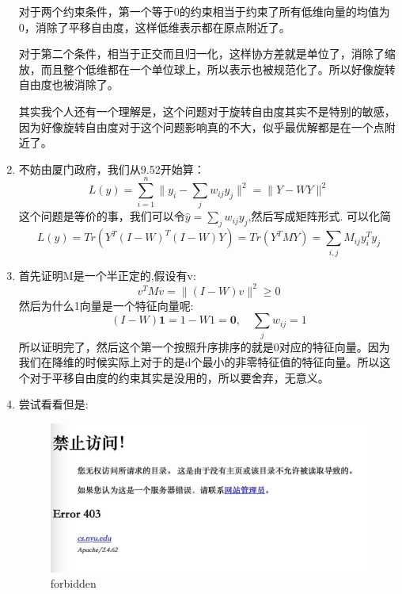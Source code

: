 \documentclass[answers]{exam}  %
\begin{document}
\begin{enumerate}[label=\alph*.]
    对于两个约束条件，第一个等于0的约束相当于约束了所有低维向量的均值为0，消除了平移自由度，这样低维表示都在原点附近了。

    对于第二个条件，相当于正交而且归一化，这样协方差就是单位了，消除了缩放，而且整个低维都在一个单位球上，所以表示也被规范化了。所以好像旋转自由度也被消除了。

    其实我个人还有一个理解是，这个问题对于旋转自由度其实不是特别的敏感，因为好像旋转自由度对于这个问题影响真的不大，似乎最优解都是在一个点附近了。

    \item 不妨由厦门政府，我们从9.52开始算：
    \[
        L(y) = \sum_{i=1}^{n}\|y_i - \sum_{j} w_{ij}y_j\|^2 = \|Y - WY\|^2
    \]
    这个问题是等价的事，我们可以令$\hat{y} = \sum_{j} w_{ij}y_j$,然后写成矩阵形式. 可以化简 
    \[
        L(y) = Tr(Y^T(I - W)^T(I- W)Y) = Tr(Y^T M Y) = \sum_{i,j} M_{ij} y_i^T y_j
    \]
    \item 首先证明M是一个半正定的,假设有v:
    \[
        v^T M v= \|(I - W)v\|^2 \geq 0
    \]
    然后为什么1向量是一个特征向量呢:
    \[
        (I - W)\mathbf{1} = 1 - W1 = \mathbf{0}, \quad \sum_{j}w_{ij} = 1
    \]
    所以证明完了，然后这个第一个按照升序排序的就是0对应的特征向量。因为我们在降维的时候实际上对于的是d个最小的非零特征值的特征向量。所以这个对于平移自由度的约束其实是没用的，所以要舍弃，无意义。
    \item 尝试看看但是:
    \begin{figure}[h!]
        \centering
        \includegraphics[scale=0.3]{forbid.png}
        \caption{forbidden}
        \label{forbidden}
    \end{figure}
\end{enumerate}
\end{document}

